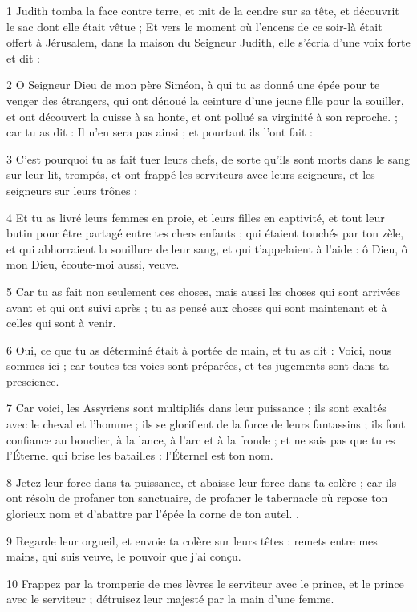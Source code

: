 \par 1 Judith tomba la face contre terre, et mit de la cendre sur sa tête, et découvrit le sac dont elle était vêtue ; Et vers le moment où l'encens de ce soir-là était offert à Jérusalem, dans la maison du Seigneur Judith, elle s'écria d'une voix forte et dit :
\par 2 O Seigneur Dieu de mon père Siméon, à qui tu as donné une épée pour te venger des étrangers, qui ont dénoué la ceinture d'une jeune fille pour la souiller, et ont découvert la cuisse à sa honte, et ont pollué sa virginité à son reproche. ; car tu as dit : Il n'en sera pas ainsi ; et pourtant ils l'ont fait :
\par 3 C'est pourquoi tu as fait tuer leurs chefs, de sorte qu'ils sont morts dans le sang sur leur lit, trompés, et ont frappé les serviteurs avec leurs seigneurs, et les seigneurs sur leurs trônes ;
\par 4 Et tu as livré leurs femmes en proie, et leurs filles en captivité, et tout leur butin pour être partagé entre tes chers enfants ; qui étaient touchés par ton zèle, et qui abhorraient la souillure de leur sang, et qui t'appelaient à l'aide : ô Dieu, ô mon Dieu, écoute-moi aussi, veuve.
\par 5 Car tu as fait non seulement ces choses, mais aussi les choses qui sont arrivées avant et qui ont suivi après ; tu as pensé aux choses qui sont maintenant et à celles qui sont à venir.
\par 6 Oui, ce que tu as déterminé était à portée de main, et tu as dit : Voici, nous sommes ici ; car toutes tes voies sont préparées, et tes jugements sont dans ta prescience.
\par 7 Car voici, les Assyriens sont multipliés dans leur puissance ; ils sont exaltés avec le cheval et l'homme ; ils se glorifient de la force de leurs fantassins ; ils font confiance au bouclier, à la lance, à l'arc et à la fronde ; et ne sais pas que tu es l'Éternel qui brise les batailles : l'Éternel est ton nom.
\par 8 Jetez leur force dans ta puissance, et abaisse leur force dans ta colère ; car ils ont résolu de profaner ton sanctuaire, de profaner le tabernacle où repose ton glorieux nom et d'abattre par l'épée la corne de ton autel. .
\par 9 Regarde leur orgueil, et envoie ta colère sur leurs têtes : remets entre mes mains, qui suis veuve, le pouvoir que j'ai conçu.
\par 10 Frappez par la tromperie de mes lèvres le serviteur avec le prince, et le prince avec le serviteur ; détruisez leur majesté par la main d'une femme.
